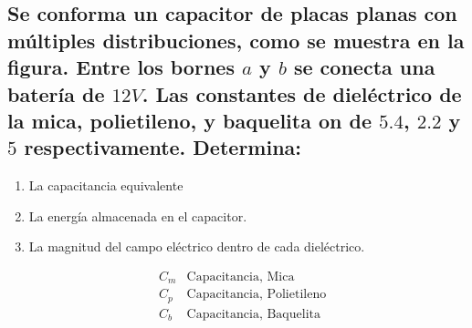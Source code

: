 \documentclass[10pt, twoside]{article}
\begin{document}
\subsection*{Se conforma un capacitor de placas planas con múltiples
	distribuciones, como se muestra en la figura.
	Entre los bornes $a$ y $b$ se conecta una batería de $12V$.
	Las constantes de dieléctrico de la mica, polietileno, y baquelita on de $5.4$,
	$2.2$ y $5$ respectivamente. Determina:
	}
\begin{enumerate}[label=\alph*.]
	\item La capacitancia equivalente
	\item La energía almacenada en el capacitor.
	\item La magnitud del campo eléctrico dentro de cada dieléctrico.
\end{enumerate}
\begin{figure}[H]
	\centering
	
\end{figure}
\begin{align*}
	&C_m &\text{Capacitancia, Mica}\\
	&C_p &\text{Capacitancia, Polietileno}\\
	&C_b &\text{Capacitancia, Baquelita}\\
\end{align*}
\end{document}
